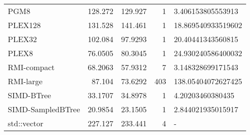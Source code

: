 \begin{tabular}{lrrrl}
 PGM8              &               128.272  &              129.927  &            1 & 3.406153805553913  \\
 PLEX128           &               131.528  &              141.461  &            1 & 18.869540933519602 \\
 PLEX32            &               102.084  &               97.9293 &            1 & 20.40441343560815  \\
 PLEX8             &                76.0505 &               80.3045 &            1 & 24.930240586400032 \\
 RMI-compact       &                68.2063 &               57.9312 &            7 & 3.148328699171543  \\
 RMI-large         &                87.104  &               73.6292 &          403 & 138.05404072627425 \\
 SIMD-BTree        &                33.1707 &               34.8978 &            1 & 4.20203460380435   \\
 SIMD-SampledBTree &                20.9854 &               23.1505 &            1 & 2.844021935015917  \\
 std::vector       &               227.127  &              233.441  &            4 & -                  \\
\hline
\end{tabular}